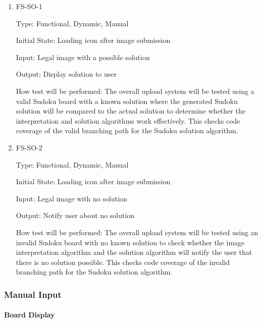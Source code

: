 \documentclass[11pt]{article}
\begin{document}
\begin{enumerate}

\item{FS-SO-1\\}

Type: Functional, Dynamic, Manual
					
Initial State: Loading icon after image submission
					
Input: Legal image with a possible solution
					
Output: Display solution to user
					
How test will be performed: The overall upload system will be tested using a valid Sudoku board with a known solution where the generated Sudoku solution will be compared to the actual solution to determine whether the interpretation and solution algorithms work effectively. This checks code coverage of the valid branching path for the Sudoku solution algorithm.
					
\item{FS-SO-2\\}

Type: Functional, Dynamic, Manual
					
Initial State: Loading icon after image submission
					
Input: Legal image with no solution
					
Output: Notify user about no solution
					
How test will be performed: The overall upload system will be tested using an invalid Sudoku board with no known solution to check whether the image interpretation algorithm and the solution algorithm will notify the user that there is no solution possible. This checks code coverage of the invalid branching path for the Sudoku solution algorithm.

\end{enumerate}

\subsubsection{Manual Input}

\paragraph{Board Display}
\end{document}

